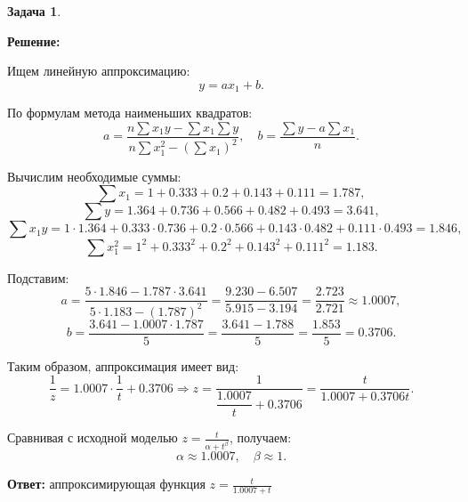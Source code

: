 \documentclass[a4paper,11pt]{article}
\newenvironment{shdd}{\begin{mdframed}[backgroundcolor=shadecolor]}{\end{mdframed}}
\theoremstyle{definition}
\newtheorem{problem}{Задача}\setlength{\parindent}{0pt}
\newenvironment{solution}
{\begin{shdd}
     \textbf{Решение:}\par\setlength{\parindent}{0pt}}
     {
\end{shdd}}
\newenvironment{answer}
{\par\noindent\textbf{Ответ:}}
{\par}
\begin{document}
\begin{problem}
\begin{solution}
            Ищем линейную аппроксимацию:
            \[
            y = a x_1 + b.
            \]

            По формулам метода наименьших квадратов:
            \[
            a = \frac{n \sum x_1 y - \sum x_1 \sum y}{n \sum x_1^2 - (\sum x_1)^2}, \quad
            b = \frac{\sum y - a \sum x_1}{n}.
            \]

            Вычислим необходимые суммы:
            \[
            \sum x_1 = 1 + 0.333 + 0.2 + 0.143 + 0.111 = 1.787,
            \]
            \[
            \sum y = 1.364 + 0.736 + 0.566 + 0.482 + 0.493 = 3.641,
            \]
            \[
            \sum x_1 y = 1 \cdot 1.364 + 0.333 \cdot 0.736 + 0.2 \cdot 0.566 + 0.143 \cdot 0.482 + 0.111 \cdot 0.493 = 1.846,
            \]
            \[
            \sum x_1^2 = 1^2 + 0.333^2 + 0.2^2 + 0.143^2 + 0.111^2 = 1.183.
            \]

            Подставим:
            \[
            a = \frac{5 \cdot 1.846 - 1.787 \cdot 3.641}{5 \cdot 1.183 - (1.787)^2}
            = \frac{9.230 - 6.507}{5.915 - 3.194}
            = \frac{2.723}{2.721} \approx 1.0007,
            \]
            \[
            b = \frac{3.641 - 1.0007 \cdot 1.787}{5}
            = \frac{3.641 - 1.788}{5}
            = \frac{1.853}{5} = 0.3706.
            \]

            Таким образом, аппроксимация имеет вид:
            \[
            \frac{1}{z} = 1.0007 \cdot \frac{1}{t} + 0.3706
            \Rightarrow
            z = \frac{1}{\dfrac{1.0007}{t} + 0.3706} = \frac{t}{1.0007 + 0.3706 t}.
            \]

            Сравнивая с исходной моделью \( z = \frac{t}{\alpha + t^{\beta}} \), получаем:
            \[
            \alpha \approx 1.0007, \quad \beta \approx 1.
            \]

        \end{solution}

        \begin{answer}
            аппроксимирующая функция
            \(z = \frac{t}{1.0007 + t}\)
        \end{answer}


    \end{problem}
\end{document}
